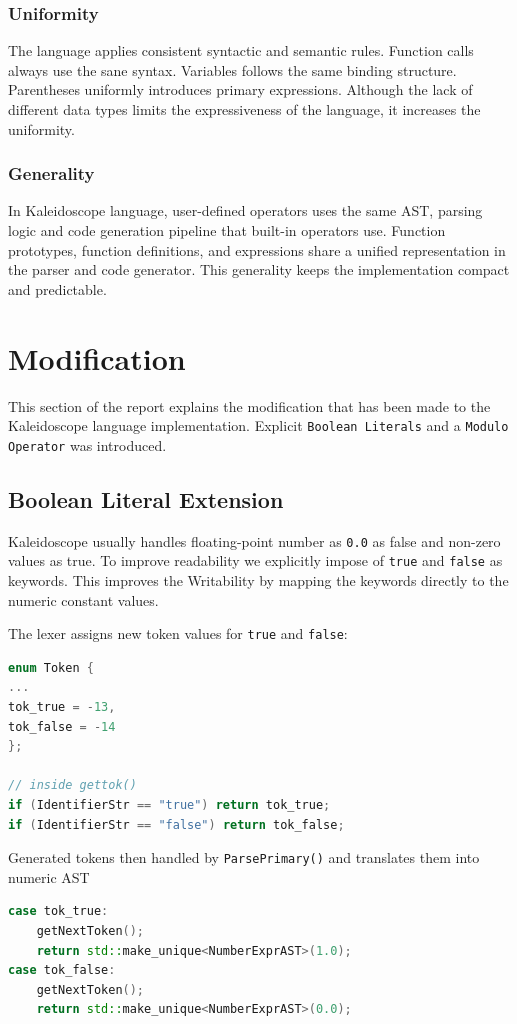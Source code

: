 \documentclass[acmlarge, nonacm]{acmart}
\begin{document}
\subsubsection{Uniformity}
The language applies consistent syntactic and semantic rules. Function calls always use the sane syntax. Variables follows the same binding structure. Parentheses uniformly introduces primary expressions. Although the lack of different data types limits the expressiveness of the language, it increases the uniformity.
\subsubsection{Generality}
In Kaleidoscope language, user-defined operators uses the same AST, parsing logic and code generation pipeline that built-in operators use. Function prototypes, function definitions, and expressions share a unified representation in the parser and code generator. This generality keeps the implementation compact and predictable.

\section{Modification}
This section of the report explains the modification that has been made to the Kaleidoscope language implementation. Explicit \verb|Boolean Literals| and a \verb|Modulo Operator| was introduced.

\subsection{Boolean Literal Extension}
Kaleidoscope usually handles floating-point number as \verb|0.0| as false and non-zero values as true. To improve readability we explicitly impose of \verb|true| and \verb|false| as keywords. This improves the Writability by mapping the keywords directly to the numeric constant values.

The lexer assigns new token values for \verb|true| and \verb|false|:
\begin{lstlisting}[language=C++]
enum Token {
...
tok_true = -13,
tok_false = -14
};

// inside gettok()
if (IdentifierStr == "true") return tok_true;
if (IdentifierStr == "false") return tok_false;
\end{lstlisting}

Generated tokens then handled by \verb|ParsePrimary()| and translates them into numeric AST
\begin{lstlisting}[language=C++]
case tok_true:
	getNextToken();
    return std::make_unique<NumberExprAST>(1.0);
case tok_false:
    getNextToken();
    return std::make_unique<NumberExprAST>(0.0);
\end{lstlisting}
\end{document}
